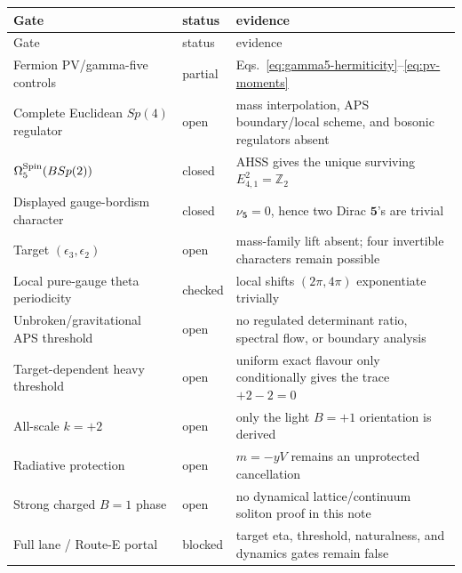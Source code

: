 \documentclass[11pt]{article}
\theoremstyle{definition}
\theoremstyle{remark}
\newcommand{\ZZ}{\mathbb Z}
\newcommand{\status}[1]{\textcolor{blue!60!black}{\textsf{#1}}}
\begin{document}
\begin{longtable}{@{}L{0.42\textwidth}L{0.14\textwidth}L{0.38\textwidth}@{}}
\toprule
Gate & status & evidence\\
\midrule
\endfirsthead
\toprule
Gate & status & evidence\\
\midrule
\endhead
Fermion PV/gamma-five controls & \status{partial} &
Eqs.~\eqref{eq:gamma5-hermiticity}--\eqref{eq:pv-moments}\\
Complete Euclidean \(Sp(4)\) regulator & \status{open} &
mass interpolation, APS boundary/local scheme, and bosonic regulators absent\\
\(\Omega_5^{\rm Spin}(BSp(2))\) & \status{closed} &
AHSS gives the unique surviving \(E^2_{4,1}=\ZZ_2\)\\
Displayed gauge-bordism character & \status{closed} &
\(\nu_{\bm5}=0\), hence two Dirac \(\bm5\)'s are trivial\\
Target \((\epsilon_3,\epsilon_2)\) & \status{open} &
mass-family lift absent; four invertible characters remain possible\\
Local pure-gauge theta periodicity & \status{checked} &
local shifts \((2\pi,4\pi)\) exponentiate trivially\\
Unbroken/gravitational APS threshold & \status{open} &
no regulated determinant ratio, spectral flow, or boundary analysis\\
Target-dependent heavy threshold & \status{open} &
uniform exact flavour only conditionally gives the trace \(+2-2=0\)\\
All-scale \(k=+2\) & \status{open} &
only the light \(B=+1\) orientation is derived\\
Radiative protection & \status{open} &
\(m=-yV\) remains an unprotected cancellation\\
Strong charged \(B=1\) phase & \status{open} &
no dynamical lattice/continuum soliton proof in this note\\
Full lane / Route-E portal & \status{blocked} &
target eta, threshold, naturalness, and dynamics gates remain false\\
\bottomrule
\end{longtable}
\end{document}
